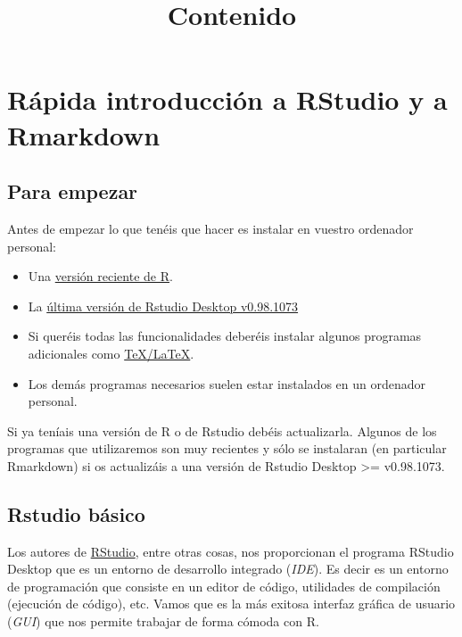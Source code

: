 \documentclass[]{article}
\title{Contenido}
\author{}
\date{}
\begin{document}
\maketitle


{
\hypersetup{linkcolor=black}
\setcounter{tocdepth}{2}
\tableofcontents
}
\section{Rápida introducción a RStudio y a
Rmarkdown}\label{rapida-introduccion-a-rstudio-y-a-rmarkdown}

\subsection{Para empezar}\label{para-empezar}

Antes de empezar lo que tenéis que hacer es instalar en vuestro
ordenador personal:

\begin{itemize}
\itemsep1pt\parskip0pt
\item
  Una \href{http://cran.es.r-project.org/}{versión reciente de R}.
\item
  La \href{http://www.rstudio.com/products/rstudio/download/}{última
  versión de Rstudio Desktop v0.98.1073}
\item
  Si queréis todas las funcionalidades deberéis instalar algunos
  programas adicionales como
  \href{http://latex-project.org/ftp.html}{TeX/LaTeX}.
\item
  Los demás programas necesarios suelen estar instalados en un ordenador
  personal.
\end{itemize}

Si ya teníais una versión de R o de Rstudio debéis actualizarla. Algunos
de los programas que utilizaremos son muy recientes y sólo se instalaran
(en particular Rmarkdown) si os actualizáis a una versión de Rstudio
Desktop \textgreater{}= v0.98.1073.

\subsection{Rstudio básico}\label{rstudio-basico}

Los autores de \href{http://www.rstudio.com/}{RStudio}, entre otras
cosas, nos proporcionan el programa RStudio Desktop que es un entorno de
desarrollo integrado (\emph{IDE}). Es decir es un entorno de
programación que consiste en un editor de código, utilidades de
compilación (ejecución de código), etc. Vamos que es la más exitosa
interfaz gráfica de usuario (\emph{GUI}) que nos permite trabajar de
forma cómoda con R.
\end{document}
